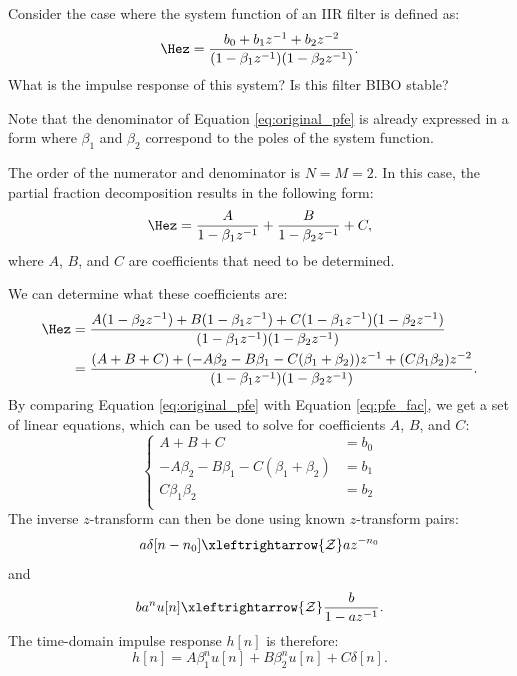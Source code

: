 Consider the case where the system function of an IIR filter is defined as:
\begin{equation}
\Hez= \frac{b_0 + b_1 z^{-1} + b_2 z^{-2}}{(1-\beta_1 z^{-1})(1-\beta_2 z^{-1})}.
\label{eq:original_pfe}
\end{equation}
What is the impulse response of this system? Is this filter BIBO
stable?

Note that the denominator of Equation \ref{eq:original_pfe} is already
expressed in a form where $\beta_1$ and $\beta_2$ correspond to the poles
of the system function.

The order of the numerator and denominator is $N=M=2$. In this case,
the partial fraction decomposition results in the following form:
\begin{equation}
\Hez = \frac{A}{1-\beta_1 z^{-1}} + \frac{B}{1-\beta_2 z^{-1}} + C,
\end{equation}
where $A$, $B$, and $C$ are coefficients that need to be determined. 

We can determine what these coefficients are:
\begin{align}
\Hez &= \frac{A(1-\beta_2 z^{-1})+B(1-\beta_1 z^{-1})+C(1-\beta_1 z^{-1})(1-\beta_2 z^{-1})}{(1-\beta_1 z^{-1})(1-\beta_2 z^{-1})} \\
     &= \frac{ (A+B+C) + (-A\beta_2 -B \beta_1 - C(\beta_1+\beta_2))z^{-1} + (C\beta_1 \beta_2)z^{-2}}{(1-\beta_1 z^{-1})(1-\beta_2 z^{-1})}\label{eq:pfe_fac}.
\end{align}
By comparing Equation \ref{eq:original_pfe} with
Equation \ref{eq:pfe_fac}, we get a set of linear equations, which can
be used to solve for coefficients $A$, $B$, and $C$:
\begin{equation}
\left\{ \begin{array}{cc}
A+B+C &= b_0 \\
-A\beta_2-B\beta_1-C(\beta_1+\beta_2) &= b_1 \\
C\beta_1\beta_2 &= b_2 \\
\end{array}
\right.
\end{equation}
The inverse $z$-transform can then be done using known $z$-transform pairs:
\begin{equation}
a\delta[n-n_0] \xleftrightarrow{\mathcal{Z}} a z^{-n_0}
\end{equation}
and
\begin{equation}
b a^n u[n] \xleftrightarrow{\mathcal{Z}} \frac{b}{1-az^{-1}}.
\end{equation}
The time-domain impulse response $h[n]$ is therefore:
\begin{equation}
h[n] = A \beta_1^n u[n] + B \beta_2^n u[n] + C\delta[n].
\end{equation}

